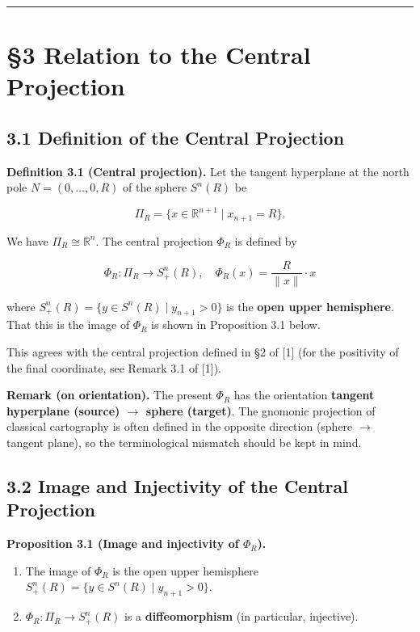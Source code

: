 \documentclass[
]{ltjsarticle}
\begin{document}
\begin{center}\rule{0.5\linewidth}{0.5pt}\end{center}

\section{§3 Relation to the Central
Projection}\label{relation-to-the-central-projection}

\subsection{3.1 Definition of the Central
Projection}\label{definition-of-the-central-projection}

\textbf{Definition 3.1 (Central projection).} Let the tangent hyperplane
at the north pole \(N = (0, \ldots, 0, R)\) of the sphere \(S^n(R)\) be

\[\Pi_R = \{x \in \mathbb{R}^{n+1} \mid x_{n+1} = R\}. \tag{3.1}\]

We have \(\Pi_R \cong \mathbb{R}^n\). The central projection \(\Phi_R\)
is defined by

\[\Phi_R: \Pi_R \to S^n_+(R), \quad \Phi_R(x) = \frac{R}{\|x\|} \cdot x \tag{3.2}\]

where \(S^n_+(R) = \{y \in S^n(R) \mid y_{n+1} > 0\}\) is the
\textbf{open upper hemisphere}. That this is the image of \(\Phi_R\) is
shown in Proposition 3.1 below.

This agrees with the central projection defined in §2 of {[}1{]} (for
the positivity of the final coordinate, see Remark 3.1 of {[}1{]}).

\textbf{Remark (on orientation).} The present \(\Phi_R\) has the
orientation \textbf{tangent hyperplane (source) \(\to\) sphere
(target)}. The gnomonic projection of classical cartography is often
defined in the opposite direction (sphere \(\to\) tangent plane), so the
terminological mismatch should be kept in mind.

\subsection{3.2 Image and Injectivity of the Central
Projection}\label{image-and-injectivity-of-the-central-projection}

\textbf{Proposition 3.1 (Image and injectivity of \(\Phi_R\)).}

\begin{enumerate}
\def\labelenumi{(\roman{enumi})}
\item
  The image of \(\Phi_R\) is the open upper hemisphere
  \(S^n_+(R) = \{y \in S^n(R) \mid y_{n+1} > 0\}\).
\item
  \(\Phi_R: \Pi_R \to S^n_+(R)\) is a \textbf{diffeomorphism} (in
  particular, injective).
\end{enumerate}
\end{document}
